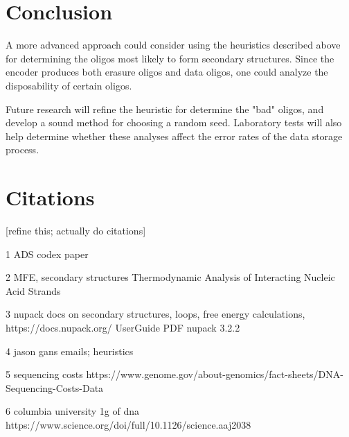 \documentclass{article}
\begin{document}
\section{Conclusion}
A more advanced approach could consider using the heuristics described above for determining the oligos most likely to form secondary structures. Since the encoder produces both erasure oligos and data oligos, one could analyze the disposability of certain oligos. 

Future research will refine the heuristic for determine the "bad" oligos, and develop a sound method for choosing a random seed. Laboratory tests will also help determine whether these analyses affect the error rates of the data storage process.

\section{Citations}
[refine this; actually do citations]

1 ADS codex paper 


2 MFE, secondary structures
Thermodynamic Analysis of
Interacting Nucleic Acid Strands 

3 nupack docs on secondary structures, loops, free energy calculations,
https://docs.nupack.org/ 
UserGuide PDF nupack 3.2.2

4 jason gans emails; heuristics

5 sequencing costs 
https://www.genome.gov/about-genomics/fact-sheets/DNA-Sequencing-Costs-Data

6 columbia university 1g of dna 
https://www.science.org/doi/full/10.1126/science.aaj2038
\end{document}

